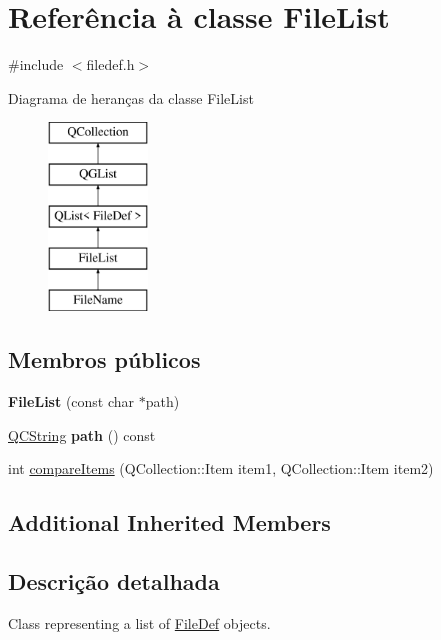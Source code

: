 \hypertarget{class_file_list}{\section{Referência à classe File\-List}
\label{class_file_list}
}


{\ttfamily \#include $<$filedef.\-h$>$}

Diagrama de heranças da classe File\-List\begin{figure}[H]
\begin{center}
\leavevmode
\includegraphics[height=5.000000cm]{class_file_list}
\end{center}
\end{figure}
\subsection*{Membros públicos}
\begin{DoxyCompactItemize}
\item 
\hypertarget{class_file_list_ae7f36b9ba9aa69a3778f5605c2c97211}{{\bfseries File\-List} (const char $\ast$path)}\label{class_file_list_ae7f36b9ba9aa69a3778f5605c2c97211}

\item 
\hypertarget{class_file_list_a477fe63d10df1c3d9675d8652b7bcfa4}{\hyperlink{class_q_c_string}{Q\-C\-String} {\bfseries path} () const }\label{class_file_list_a477fe63d10df1c3d9675d8652b7bcfa4}

\item 
int \hyperlink{class_file_list_a219450accf048597ffc7113ecde4c402}{compare\-Items} (Q\-Collection\-::\-Item item1, Q\-Collection\-::\-Item item2)
\end{DoxyCompactItemize}
\subsection*{Additional Inherited Members}


\subsection{Descrição detalhada}
Class representing a list of \hyperlink{class_file_def}{File\-Def} objects. 

